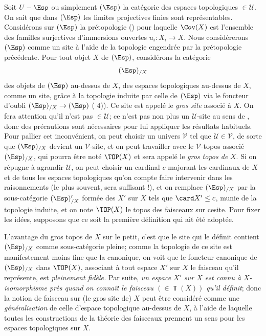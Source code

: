 \documentclass[10pt]{../fichiers-configuration-latex/smfart}
\begin{document}
Soit $U-\Esp$ ou simplement $(\Esp)$ la catégorie des espaces
topologiques $\in 𝒰$. On sait que dans $(\Esp)$ les limites
projectives finies sont représentables. Considérons sur $(\Esp)$
la prétopologie () pour laquelle $\Cov(X)$ est
l'ensemble des familles surjectives d'immersions ouvertes
$u_i:X_i\rightarrow X$. Nous considérerons $(\Esp)$ comme un site
à l'aide de la topologie engendrée par la prétopologie
précédente. Pour tout objet $X$ de $(\Esp)$, considérons la
catégorie
$$
(\Esp)_{/X}
$$
des objets de $(\Esp)$ au-dessus de $X$, \ie des espaces
topologiques au-dessus de $X$, comme un site, grâce à la topologie
induite par celle de $(\Esp)$ via le foncteur d'oubli
$(\Esp)_{/X}\rightarrow (\Esp)$ ( 4)). Ce site est
appelé le \emph{gros site} associé à $X$. On fera attention qu'il
n'est pas $\in 𝒰$; ce n'est pas non plus un $𝒰$-site
au sens de , donc des précautions sont nécessaires
pour lui appliquer les résultats habituels. Pour pallier cet
inconvénient, on peut choisir un univers $𝒱$ tel que
$𝒰\in 𝒱$, de sorte que $(\Esp)_{/X}$ devient un
$𝒱$-site, et on peut travailler avec le $𝒱$-topos
associé $(\Esp)_{/X}$, qui pourra être noté $\TOP(X)$ et sera appelé
le \emph{gros topos de} $X$. Si on répugne à agrandir $𝒰$,
on peut choisir un cardinal $c$ majorant les cardinaux de $X$ et de
tous les espaces topologiques qu'on compte faire intervenir dans les
raisonnements (le plus souvent, 
sera suffisant !), et on remplace $(\Esp)_{/X}$ par la
sous-catégorie $(\Esp)'_{/X}$ formée des $X'$ sur $X$ tels que
$\card X'\leq c$, munie de la topologie induite, et on note
$\TOP(X)$ le topos des faisceaux sur ce\pageoriginale site. Pour
fixer les idées, supposons que ce soit la première définition qui
ait été adoptée.

L'avantage du gros topos de $X$ sur le petit, c'est que le site qui
le définit contient $(\Esp)_{/X}$ comme sous-catégorie pleine; comme
la topologie de ce site est manifestement moins fine que la
canonique, on voit que le foncteur canonique de $(\Esp)_{/X}$ dans
$\TOP(X)$, associant à tout espace $X'$ sur $X$ le faisceau qu'il
représente, est \emph{pleinement fidèle.} Par suite, \emph{un espace
$X'$ sur $X$ est connu à $X$-isomorphisme près quand on connaît le
faisceau $(\in \Top(X))$ qu'il définit}; donc la notion de faisceau
sur (le gros site de) $X$ peut être considéré comme une
\emph{généralisation} de celle d'espace topologique au-dessus de
$X$, à l'aide de laquelle toutes les constructions de la théorie des
faisceaux prennent un sens pour les espaces topologiques sur $X$.
\end{document}
